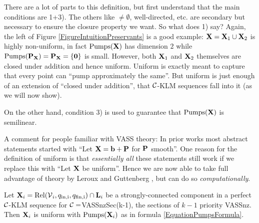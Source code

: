 There are a lot of parts to this definition, but first understand that the main conditions are 1+3). The others like \(\neq \emptyset\), well-directed, etc. are secondary but necessary to ensure the closure property we want. So what does 1) say? Again, the left of Figure \ref{FigureIntuitionPreservants} is a good example: \(\mathbf{X}=\mathbf{X}_1 \cup \mathbf{X}_2\) is highly non-uniform, in fact \(\operatorname{Pumps}(\mathbf{X})\) has dimension \(2\) while \(\operatorname{Pumps}(\operatorname{\mathbf{P}_{\mathbf{X}}})=\operatorname{\mathbf{P}_{\mathbf{X}}}=\{\mathbf{0}\}\) is small. However, both \(\mathbf{X}_1\) and \(\mathbf{X}_2\) themselves are closed under addition and hence uniform. Uniform is exactly meant to capture that every point can ``pump approximately the same''. But uniform is just enough of an extension of ``closed under addition'', that \(\mathcal{C}\)-KLM sequences fall into it (as we will now show).

On the other hand, condition 3) is used to guarantee that \(\operatorname{Pumps}(\mathbf{X})\) is semilinear.

A comment for people familiar with VASS theory: In prior works most abstract statements started with ``Let \(\mathbf{X}=\mathbf{b}+\mathbf{P}\) for \(\mathbf{P}\) smooth''. One reason for the definition of uniform is that \emph{essentially all} these statements still work if we replace this with ``Let \(\mathbf{X}\) be uniform''. Hence we are now able to take full advantage of theory by Leroux \cite{Leroux11,Leroux12, Leroux13} and Guttenberg \cite{GuttenbergRE23, Guttenberg24}, but can do so \emph{computationally}.

\begin{lemma} \label{LemmaSingleComponentUniform}
Let \(\mathbf{X}_i=\operatorname{Rel}(\operatorname{\mathcal{V}}_i, q_{\text{in,i}}, q_{\text{fin,i}}) \cap \mathbf{L}_i\) be a strongly-connected component in a perfect \(\mathcal{C}\)-KLM sequence for \(\mathcal{C}=\)VASSnzSec(k-1), the sections of \(k-1\) priority VASSnz. Then \(\mathbf{X}_i\) is uniform with \(\operatorname{Pumps}(\mathbf{X}_i)\) as in formula \eqref{EquationPumpsFormula}.
\end{lemma}

